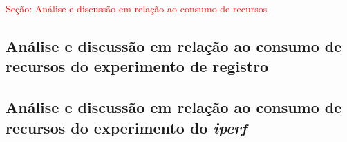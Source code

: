 \textcolor{red}{Seção: Análise e discussão em relação ao consumo de recursos}

\subsection{Análise e discussão em relação ao consumo de recursos do experimento de registro}

\subsection{Análise e discussão em relação ao consumo de recursos do experimento do \textit{iperf}}
